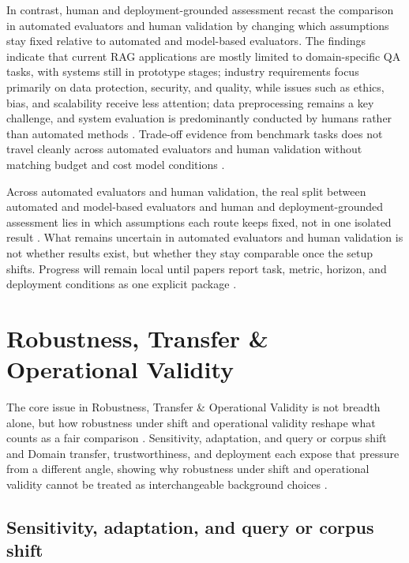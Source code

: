 \documentclass[a4paper,11pt]{article}
\begin{document}
In contrast, human and deployment-grounded assessment recast the comparison in automated evaluators and human validation by changing which assumptions stay fixed relative to automated and model-based evaluators. The findings indicate that current RAG applications are mostly limited to domain-specific QA tasks, with systems still in prototype stages; industry requirements focus primarily on data protection, security, and quality, while issues such as ethics, bias, and scalability receive less attention; data preprocessing remains a key challenge, and system evaluation is predominantly conducted by humans rather than automated methods \citep{Brehme2025Retrieval}. Trade-off evidence from benchmark tasks does not travel cleanly across automated evaluators and human validation without matching budget and cost model conditions \citep{Caruzzo2026Deceptive}.

Across automated evaluators and human validation, the real split between automated and model-based evaluators and human and deployment-grounded assessment lies in which assumptions each route keeps fixed, not in one isolated result \citep{SaadFalcon2023Ares,Murugaraj2025Ragvue,Brehme2025Retrieval,Caruzzo2026Deceptive}. What remains uncertain in automated evaluators and human validation is not whether results exist, but whether they stay comparable once the setup shifts. Progress will remain local until papers report task, metric, horizon, and deployment conditions as one explicit package \citep{Murugaraj2025Ragvue,SaadFalcon2023Ares}.
\section{Robustness, Transfer \& Operational Validity}


The core issue in Robustness, Transfer \& Operational Validity is not breadth alone, but how robustness under shift and operational validity reshape what counts as a fair comparison \citep{Muthyam2026Systems,Feng2026Rethinking,Sun2026Robust,Li2026Mrag}. Sensitivity, adaptation, and query or corpus shift and Domain transfer, trustworthiness, and deployment each expose that pressure from a different angle, showing why robustness under shift and operational validity cannot be treated as interchangeable background choices \citep{Su2025Dynamic,Bang2026Feedback,Cahoon2025Optimizing,Ding2026Attribution}.
\subsection{Sensitivity, adaptation, and query or corpus shift}
\end{document}
